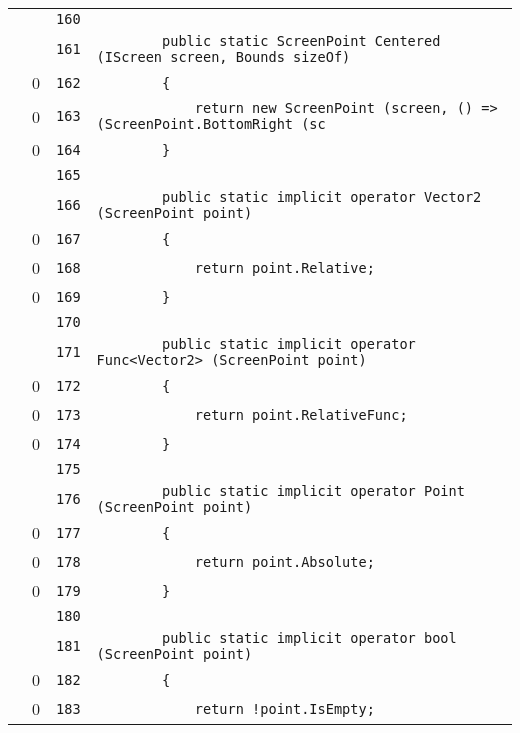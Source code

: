 \documentclass[a4paper,10pt]{article}
\begin{document}
\begin{longtable}[l]{lrrl}
\cellcolor{gray} &  & \verb~160~ & \verb~~\\
\cellcolor{gray} &  & \verb~161~ & \verb~        public static ScreenPoint Centered (IScreen screen, Bounds sizeOf)~\\
\cellcolor{red} & 0 & \verb~162~ & \verb~        {~\\
\cellcolor{red} & 0 & \verb~163~ & \verb~            return new ScreenPoint (screen, () => (ScreenPoint.BottomRight (sc~\\
\cellcolor{red} & 0 & \verb~164~ & \verb~        }~\\
\cellcolor{gray} &  & \verb~165~ & \verb~~\\
\cellcolor{gray} &  & \verb~166~ & \verb~        public static implicit operator Vector2 (ScreenPoint point)~\\
\cellcolor{red} & 0 & \verb~167~ & \verb~        {~\\
\cellcolor{red} & 0 & \verb~168~ & \verb~            return point.Relative;~\\
\cellcolor{red} & 0 & \verb~169~ & \verb~        }~\\
\cellcolor{gray} &  & \verb~170~ & \verb~~\\
\cellcolor{gray} &  & \verb~171~ & \verb~        public static implicit operator Func<Vector2> (ScreenPoint point)~\\
\cellcolor{red} & 0 & \verb~172~ & \verb~        {~\\
\cellcolor{red} & 0 & \verb~173~ & \verb~            return point.RelativeFunc;~\\
\cellcolor{red} & 0 & \verb~174~ & \verb~        }~\\
\cellcolor{gray} &  & \verb~175~ & \verb~~\\
\cellcolor{gray} &  & \verb~176~ & \verb~        public static implicit operator Point (ScreenPoint point)~\\
\cellcolor{red} & 0 & \verb~177~ & \verb~        {~\\
\cellcolor{red} & 0 & \verb~178~ & \verb~            return point.Absolute;~\\
\cellcolor{red} & 0 & \verb~179~ & \verb~        }~\\
\cellcolor{gray} &  & \verb~180~ & \verb~~\\
\cellcolor{gray} &  & \verb~181~ & \verb~        public static implicit operator bool (ScreenPoint point)~\\
\cellcolor{red} & 0 & \verb~182~ & \verb~        {~\\
\cellcolor{red} & 0 & \verb~183~ & \verb~            return !point.IsEmpty;~\\

\end{longtable}
\end{document}

